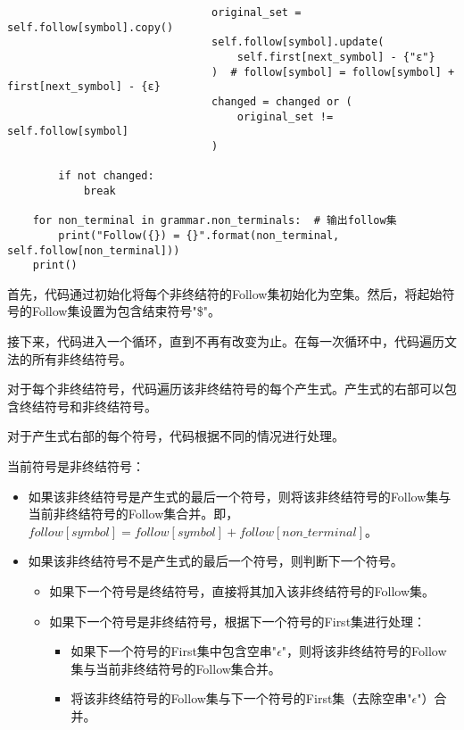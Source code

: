 \documentclass[lang=cn,11pt,a4paper]{elegantpaper}
\begin{document}
\begin{lstlisting}
                                original_set = self.follow[symbol].copy()
                                self.follow[symbol].update(
                                    self.first[next_symbol] - {"ε"}
                                )  # follow[symbol] = follow[symbol] + first[next_symbol] - {ε}
                                changed = changed or (
                                    original_set != self.follow[symbol]
                                )

        if not changed:
            break

    for non_terminal in grammar.non_terminals:  # 输出follow集
        print("Follow({}) = {}".format(non_terminal, self.follow[non_terminal]))
    print()
\end{lstlisting}


首先，代码通过初始化将每个非终结符的Follow集初始化为空集。然后，将起始符号的Follow集设置为包含结束符号"\$"。

接下来，代码进入一个循环，直到不再有改变为止。在每一次循环中，代码遍历文法的所有非终结符号。

对于每个非终结符号，代码遍历该非终结符号的每个产生式。产生式的右部可以包含终结符号和非终结符号。

对于产生式右部的每个符号，代码根据不同的情况进行处理。

当前符号是非终结符号：
\begin{itemize}
    \item 如果该非终结符号是产生式的最后一个符号，则将该非终结符号的Follow集与当前非终结符号的Follow集合并。即，$follow[symbol] = follow[symbol] + follow[non\_terminal]$。
    \item 如果该非终结符号不是产生式的最后一个符号，则判断下一个符号。
    \begin{itemize}
        \item 如果下一个符号是终结符号，直接将其加入该非终结符号的Follow集。
        \item 如果下一个符号是非终结符号，根据下一个符号的First集进行处理：
        \begin{itemize}
            \item 如果下一个符号的First集中包含空串"$\epsilon$"，则将该非终结符号的Follow集与当前非终结符号的Follow集合并。
            \item 将该非终结符号的Follow集与下一个符号的First集（去除空串"$\epsilon$"）合并。
        \end{itemize}
    \end{itemize}
          
\end{itemize}
  
\end{document}
